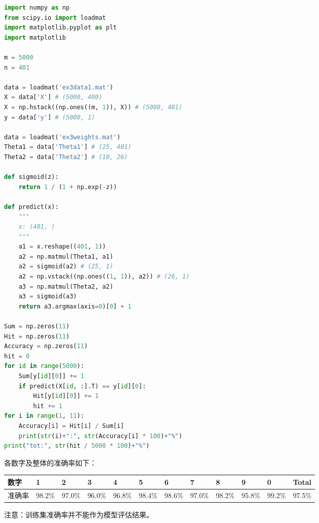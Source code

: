 \begin{lstlisting}[language=Python]
import numpy as np
from scipy.io import loadmat
import matplotlib.pyplot as plt
import matplotlib

m = 5000
n = 401

data = loadmat('ex3data1.mat')
X = data['X'] # (5000, 400)
X = np.hstack((np.ones((m, 1)), X)) # (5000, 401)
y = data['y'] # (5000, 1)

data = loadmat('ex3weights.mat')
Theta1 = data['Theta1'] # (25, 401)
Theta2 = data['Theta2'] # (10, 26)

def sigmoid(z):
	return 1 / (1 + np.exp(-z))

def predict(x):
	"""
	x: (401, )
	"""
	a1 = x.reshape((401, 1))
	a2 = np.matmul(Theta1, a1)
	a2 = sigmoid(a2) # (25, 1)
	a2 = np.vstack((np.ones((1, 1)), a2)) # (26, 1)
	a3 = np.matmul(Theta2, a2)
	a3 = sigmoid(a3)
	return a3.argmax(axis=0)[0] + 1

Sum = np.zeros(11)
Hit = np.zeros(11)
Accuracy = np.zeros(11)
hit = 0
for id in range(5000):
	Sum[y[id][0]] += 1
	if predict(X[id, :].T) == y[id][0]:
		Hit[y[id][0]] += 1
		hit += 1
for i in range(1, 11):
	Accuracy[i] = Hit[i] / Sum[i]
	print(str(i)+":", str(Accuracy[i] * 100)+"%")
print("tot:", str(hit / 5000 * 100)+"%")
\end{lstlisting}

各数字及整体的准确率如下：

\begin{table}[H]
    \centering
    \small
    \begin{tabularx}{\linewidth}{lYYYYYYYYYYY}
    \toprule
    数字 & 1 & 2 & 3 & 4 & 5 & 6 & 7 & 8 & 9 & 0 & Total \\
    \midrule
    准确率 & 98.2\% & 97.0\% & 96.0\% & 96.8\% & 98.4\% & 98.6\% & 97.0\% & 98.2\% & 95.8\% & 99.2\% & 97.5\% \\
    \bottomrule
    \end{tabularx}
\end{table}

注意：训练集准确率并不能作为模型评估结果。
